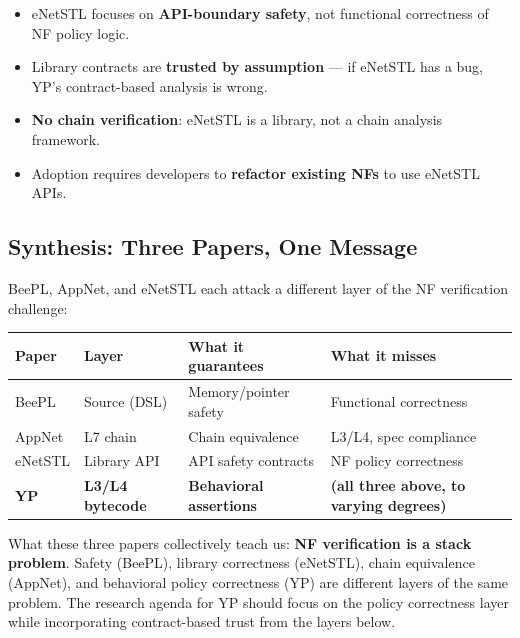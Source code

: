 \begin{limitbox}
\begin{itemize}
  \item eNetSTL focuses on \textbf{API-boundary safety}, not functional correctness of NF policy logic.
  \item Library contracts are \textbf{trusted by assumption} --- if eNetSTL has a bug, YP's contract-based analysis is wrong.
  \item \textbf{No chain verification}: eNetSTL is a library, not a chain analysis framework.
  \item Adoption requires developers to \textbf{refactor existing NFs} to use eNetSTL APIs.
\end{itemize}
\end{limitbox}

\subsection{Synthesis: Three Papers, One Message}

BeePL, AppNet, and eNetSTL each attack a different layer of the NF verification challenge:

\begin{center}
\begin{tabular}{llll}
\toprule
\textbf{Paper} & \textbf{Layer} & \textbf{What it guarantees} & \textbf{What it misses} \\
\midrule
BeePL & Source (DSL) & Memory/pointer safety & Functional correctness \\
AppNet & L7 chain & Chain equivalence & L3/L4, spec compliance \\
eNetSTL & Library API & API safety contracts & NF policy correctness \\
\midrule
\textbf{YP} & \textbf{L3/L4 bytecode} & \textbf{Behavioral assertions} & \textbf{(all three above, to varying degrees)} \\
\bottomrule
\end{tabular}
\end{center}

\begin{insightbox}
What these three papers collectively teach us: \textbf{NF verification is a stack problem}. Safety (BeePL), library correctness (eNetSTL), chain equivalence (AppNet), and behavioral policy correctness (YP) are different layers of the same problem. The research agenda for YP should focus on the policy correctness layer while incorporating contract-based trust from the layers below.
\end{insightbox}
